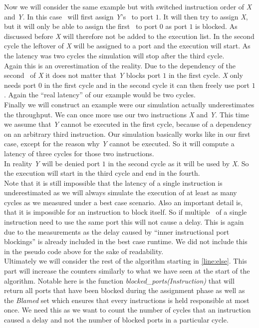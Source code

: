 Now we will consider the same example but with switched instruction order of \emph{X} and \emph{Y}. In this case \suaca\ will first assign \emph{Y}'s \microop\ to port $1$. It will then try to assign \emph{X}, but it will only be able to assign the first \microop\ to port $0$ as port $1$ is blocked. As discussed before \emph{X} will therefore not be added to the execution list. In the second cycle the leftover of \emph{X} will be assigned to a port and the execution will start. As the latency was two cycles the simulation will stop after the third cycle.\\
Again this is an overestimation of the reality. Due to the dependency of the second \microop\ of \emph{X} it does not matter that \emph{Y} blocks port $1$ in the first cycle. \emph{X} only needs port $0$ in the first cycle and in the second cycle it can then freely use port $1$. Again the ``real latency'' of our example would be two cycles.\\

Finally we will construct an example were our simulation actually underestimates the throughput. We can once more use our two instructions \emph{X} and \emph{Y}. This time we assume that \emph{Y} cannot be executed in the first cycle, because of a dependency on an arbitrary third instruction. Our simulation basically works like in our first case, except for the reason why \emph{Y} cannot be executed. So it will compute a latency of three cycles for those two instructions.\\
In reality \emph{Y} will be denied port $1$ in the second cycle as it will be used by \emph{X}. So the execution will start in the third cycle and end in the fourth.\\

Note that it is still impossible that the latency of a single instruction is underestimated as we will always simulate the execution of at least as many cycles as we measured under a best case scenario. Also an important detail is, that it is impossible for an instruction to block itself. So if multiple \microops\ of a single instruction need to use the same port this will not cause a delay. This is again due to the measurements as the delay caused by ``inner instructional port blockings'' is already included in the best case runtime. We did not include this in the pseudo code above for the sake of readability.\\

Ultimately we will consider the rest of the algorithm starting in \autoref{line:else}. This part will increase the counters similarly to what we have seen at the start of the algorithm. Notable here is the function \emph{blocked\_ports(Instruction)} that will return all ports that have been blocked during the assignment phase as well as the \emph{Blamed} set which ensures that every instructions is held responsible at most once. We need this as we want to count the number of cycles that an instruction caused a delay and not the number of blocked ports in a particular cycle.

